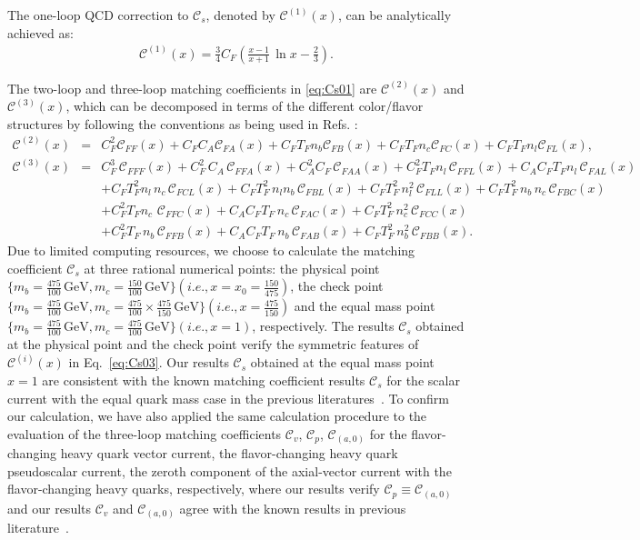 \documentclass[onecolumn,preprintnumbers,aps,superscriptaddress,nofootinbib,prd,notitlepage]{revtex4-1}
\newcommand{\beq}{\begin{eqnarray}}
\newcommand{\eeq}{\end{eqnarray}}
\newcommand{\non}{\nonumber\\ }
\begin{document}
{The one-loop QCD correction to $\mathcal{C}_s$, denoted by $\mathcal{C}^{(1)}(x)$, can be analytically achieved as:
\beq
 \mathcal{C}^{(1)}(x)=\frac{3}{4} C_F \left(\frac{x-1}{x+1}\,\ln x-\frac{2}{3}\right).
\eeq

The  two-loop and three-loop matching coefficients in \eqref{eq:Cs01} are  $\mathcal{C}^{(2)}(x)$ and $\mathcal{C}^{(3)}(x)$, which can be decomposed  in terms of the different color/flavor structures
by following the conventions as being used in Refs. \cite{Marquard:2014pea,Beneke:2014qea,Egner:2022jot,Feng:2022vvk,Feng:2022ruy,Sang:2022tnh}:
\beq
\mathcal{C}^{(2)}(x) &=& C_F^2 \mathcal{C}_{FF}(x)+C_F C_A \mathcal{C}_{FA}(x)+C_F T_F n_b \mathcal{C}_{FB}(x) +C_F T_F n_c \mathcal{C}_{FC}(x) +C_F T_F n_l \mathcal{C}_{FL}(x), \\
\mathcal{C}^{(3)}(x) &=& C^3_F \, \mathcal{C}_{FFF}(x)+C^2_F \,C_A \, \mathcal{C}_{FFA}(x) + C_A^2 C_F \, \mathcal{C}_{FAA}(x)  +  C^2_F T_F n_l\,\mathcal{C}_{FFL}(x) +C_A C_F T_F n_l\,\mathcal{C}_{FAL}(x) \non
&&  + C_F T^2_F n_l\, n_c \, \mathcal{C}_{FCL}(x) + C_FT^2_F \, n_l n_b \, \mathcal{C}_{FBL}(x)  +C_F T^2_F \, n^2_l \, \mathcal{C}_{FLL}(x) + C_F T_F^2 \, n_b \, n_c \, \mathcal{C}_{FBC}(x)  \non
&&  +     C^2_F T_F n_c\,\, \mathcal{C}_{FFC}(x)    + C_A C_F T_F \,n_c\, \mathcal{C}_{FAC}(x)+  C_FT^2_F \, n_c^2 \, \mathcal{C}_{FCC}(x) \non
&&  +   C^2_F T_F\,n_b\, \mathcal{C}_{FFB}(x)+ C_AC_F T_F\,n_b\,\mathcal{C}_{FAB}(x)+C_FT^2_F \, n_b^2 \, \mathcal{C}_{FBB}(x).
\eeq
Due to limited computing resources,
we choose to calculate the matching coefficient $\mathcal{C}_s$ at three rational numerical points: the physical point  $\{m_b=\frac{475}{100}\,\mathrm{GeV}, m_c=\frac{150}{100}\,\mathrm{GeV}\}\left(i.e.,x=x_0=\frac{150}{475}\right)$,   the check  point $\{m_b=\frac{475}{100}\,\mathrm{GeV},m_c=\frac{475}{100}\times\frac{475}{150}\,\mathrm{GeV}\}\left(i.e.,x=\frac{475}{150}\right)$ and the equal mass point $\{m_b=\frac{475}{100}\,\mathrm{GeV},m_c=\frac{475}{100}\,\mathrm{GeV}\}\left(i.e.,x=1\right)$, respectively.
The results $\mathcal{C}_s$ obtained at the physical point and the check  point verify the symmetric features of $\mathcal{C}^{(i)}(x)$ in Eq.~\eqref{eq:Cs03}. Our results $\mathcal{C}_s$ obtained at the equal mass point $x=1$ are consistent with the known  matching coefficient results $\mathcal{C}_s$ for the scalar current with the equal quark mass case in the previous literatures~\cite{Egner:2022jot,Kniehl:2006qw,Piclum:2007an}.
To confirm our calculation,  we have also applied the same calculation procedure to the evaluation of the three-loop matching coefficients $\mathcal{C}_v$, $\mathcal{C}_p$, $\mathcal{C}_{(a,0)}$  for  the flavor-changing heavy quark vector current, the flavor-changing heavy quark  pseudoscalar current,  the zeroth component of the axial-vector current with the flavor-changing heavy quarks, respectively, where our results verify  $\mathcal{C}_p\equiv\mathcal{C}_{(a,0)}$ and our results $\mathcal{C}_v$ and  $\mathcal{C}_{(a,0)}$  agree with the known results in previous literature~\cite{Kniehl:2006qw,Piclum:2007an,Marquard:2014pea,Tao:2022qxa,Egner:2022jot,Feng:2022ruy,Sang:2022tnh}.




}
\end{document}
